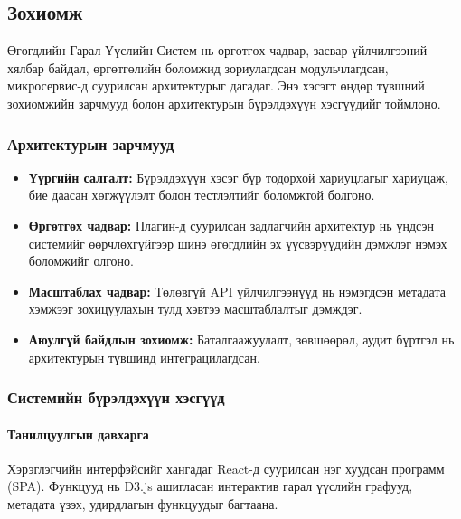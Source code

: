 \subsection{Зохиомж}
\label{subsec:dl_design}

Өгөгдлийн Гарал Үүслийн Систем нь өргөтгөх чадвар, засвар үйлчилгээний хялбар байдал, өргөтгөлийн боломжид зориулагдсан модульчлагдсан, микросервис-д суурилсан архитектурыг дагадаг. Энэ хэсэгт өндөр түвшний зохиомжийн зарчмууд болон архитектурын бүрэлдэхүүн хэсгүүдийг тоймлоно.

\subsubsection{Архитектурын зарчмууд}

\begin{itemize}
    \item \textbf{Үүргийн салгалт:} Бүрэлдэхүүн хэсэг бүр тодорхой хариуцлагыг хариуцаж, бие даасан хөгжүүлэлт болон тестлэлтийг боломжтой болгоно.
    
    \item \textbf{Өргөтгөх чадвар:} Плагин-д суурилсан задлагчийн архитектур нь үндсэн системийг өөрчлөхгүйгээр шинэ өгөгдлийн эх үүсвэрүүдийн дэмжлэг нэмэх боломжийг олгоно.
    
    \item \textbf{Масштаблах чадвар:} Төлөвгүй API үйлчилгээнүүд нь нэмэгдсэн метадата хэмжээг зохицуулахын тулд хэвтээ масштаблалтыг дэмждэг.
    
    \item \textbf{Аюулгүй байдлын зохиомж:} Баталгаажуулалт, зөвшөөрөл, аудит бүртгэл нь архитектурын түвшинд интеграцилагдсан.
\end{itemize}

\subsubsection{Системийн бүрэлдэхүүн хэсгүүд}

\paragraph{Танилцуулгын давхарга}
Хэрэглэгчийн интерфэйсийг хангадаг React-д суурилсан нэг хуудсан программ (SPA). Функцууд нь D3.js ашигласан интерактив гарал үүслийн графууд, метадата үзэх, удирдлагын функцуудыг багтаана.

